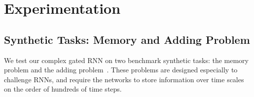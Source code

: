 \documentclass{article}
\begin{document}





\section{Experimentation}
\subsection{Synthetic Tasks: Memory and Adding Problem}

We test our complex gated RNN on two benchmark synthetic tasks: the memory problem and the adding problem~\cite{Hochreiter}.  These problems are designed especially to challenge RNNs, and require the networks to store information over time scales on the order of hundreds of time steps.  
\end{document}
